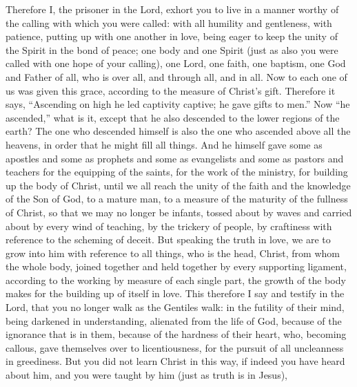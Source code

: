 \begin{biblechapter} %
 Therefore I, the prisoner in the Lord, exhort you to live in a manner worthy of the calling with which you were called:
\verse with all humility and gentleness, with patience, putting up with one another in love,
\verse being eager to keep the unity of the Spirit in the bond of peace;
\verse one body and one Spirit (just as also you were called with one hope of your calling),
\verse one Lord, one faith, one baptism,
\verse one God and Father of all, who is over all, and through all, and in all.
 Now to each one of us was given this grace, according to the measure of Christ’s gift.
\verse Therefore it says, “Ascending on high he led captivity captive; 
he gave gifts to men.”
\verse Now “he ascended,” what is it, except that he also descended to the lower regions of the earth?
\verse The one who descended himself is also the one who ascended above all the heavens, in order that he might fill all things.
\verse And he himself gave some as apostles and some as prophets and some as evangelists and some as pastors and teachers
\verse for the equipping of the saints, for the work of the ministry, for building up the body of Christ,
\verse until we all reach the unity of the faith and the knowledge of the Son of God, to a mature man, to a measure of the maturity of the fullness of Christ,
\verse so that we may no longer be infants, tossed about by waves and carried about by every wind of teaching, by the trickery of people, by craftiness with reference to the scheming of deceit.
\verse But speaking the truth in love, we are to grow into him with reference to all things, who is the head, Christ,
\verse from whom the whole body, joined together and held together by every supporting ligament, according to the working by measure of each single part, the growth of the body makes for the building up of itself in love.
 This therefore I say and testify in the Lord, that you no longer walk as the Gentiles walk: in the futility of their mind,
\verse being darkened in understanding, alienated from the life of God, because of the ignorance that is in them, because of the hardness of their heart,
\verse who, becoming callous, gave themselves over to licentiousness, for the pursuit of all uncleanness in greediness.
\verse But you did not learn Christ in this way,
\verse if indeed you have heard about him, and you were taught by him (just as truth is in Jesus),

\end{biblechapter}
